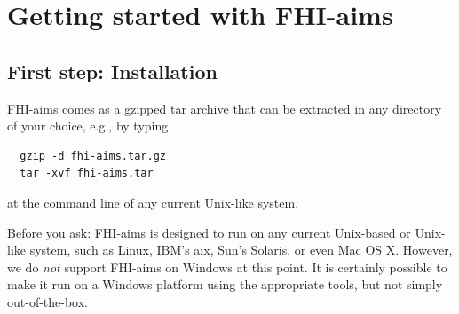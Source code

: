 \chapter{Getting started with FHI-aims}
\label{Ch:quickstart}

\section{First step: Installation}

FHI-aims comes as a gzipped tar archive that can be extracted in any directory
of your choice, e.g., by typing

\begin{verbatim}
  gzip -d fhi-aims.tar.gz
  tar -xvf fhi-aims.tar
\end{verbatim}

at the
command line of any current Unix-like system.

\begin{center}
  \parbox[c]{0.8\textwidth}
  {\small
    Before you ask: FHI-aims is designed to run on any current Unix-based or
    Unix-like system, such as Linux, IBM's aix, Sun's Solaris, or even Mac OS
    X. However, we do \emph{not} support FHI-aims on Windows at this point. It
    is certainly possible to make it run on a Windows platform using the
    appropriate tools, but not simply out-of-the-box. 
  } 
\end{center}

